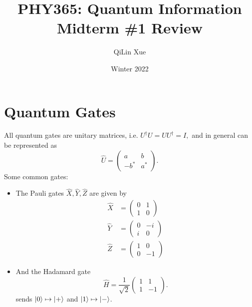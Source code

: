 \documentclass{article}
\title{PHY365: Quantum Information \\ Midterm \#1 Review}
\author{QiLin Xue}
\date{Winter 2022}
\numberwithin{equation}{section}
\begin{document}
\maketitle
\tableofcontents
\newpage
\section{Quantum Gates}
All quantum gates are unitary matrices, i.e. $U^\dagger U = UU^\dagger = I,$ and in general can be represented as
\begin{equation}
    \hat{U} = \begin{pmatrix}
        a & b \\ 
        -b^* & a^*
    \end{pmatrix}.
\end{equation}
Some common gates:
\begin{itemize}
    \item The Pauli gates $\hat{X},\hat{Y},\hat{Z}$ are given by
    \begin{align*}
        \hat{X} &= \begin{pmatrix}
            0 & 1 \\ 
            1 & 0
        \end{pmatrix} \\ 
        \hat{Y} &= \begin{pmatrix}
            0 & -i \\ 
            i & 0
        \end{pmatrix} \\
        \hat{Z} &= \begin{pmatrix}
            1 & 0 \\ 
            0 & -1
        \end{pmatrix}
    \end{align*}
    \item And the Hadamard gate 
    \begin{equation}
        \hat{H} = \frac{1}{\sqrt{2}} \begin{pmatrix}
            1 & 1 \\ 
            1 & -1
        \end{pmatrix}.
    \end{equation}
    sends $\ket{0} \mapsto \ket{+}$ and $\ket{1} \mapsto \ket{-}$.
\end{itemize}
\end{document}
